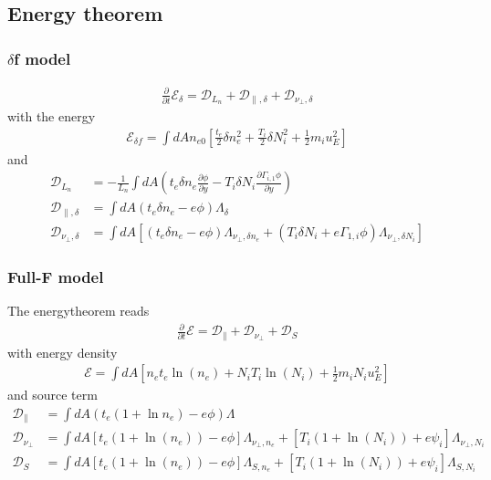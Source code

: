 \documentclass{hitec} %
\begin{document}
\subsection{Energy theorem}
\subsubsection{\(\delta\)f model}
\begin{eqnarray}
 \frac{\partial}{\partial t}  \mathcal{E}_{\delta } = \mathcal{D}_{L_n}+ \mathcal{D}_{\parallel,\delta } + \mathcal{D}_{\nu_\perp,\delta }
\end{eqnarray}
with the energy
\begin{eqnarray}
 \mathcal{E}_{\delta f} =  \int dA n_{e0}\left[\frac{t_e}{2} \delta{n}_e^2  +  \frac{T_i}{2} \delta{N}_i^2    + \frac{1}{2} m_i  u_E^2\right]
\end{eqnarray}
and 
\begin{align}
 \mathcal{D}_{L_n}                  &= - \frac{1}{L_n}\int dA \left( t_e \delta{n}_e \frac{\partial \phi }{\partial y}  - T_i \delta{N}_i \frac{\partial \Gamma_{i,1} \phi }{\partial y} \right) \\
\mathcal{D}_{\parallel,\delta } &=  \int dA \left(t_e \delta{n}_e - e \phi \right) \Lambda_\delta \\
\mathcal{D}_{\nu_\perp,\delta } &=  \int dA \left[ \left(t_e \delta{n}_e - e \phi \right) \Lambda_{\nu_\perp,\delta n_e} +  \left(T_i \delta{N}_i + e \Gamma_{1,i} \phi \right) \Lambda_{\nu_\perp,\delta N_i}\right]
\end{align}

\subsubsection{Full-F model}
The energytheorem reads
\begin{eqnarray}
 \frac{\partial}{\partial t}  \mathcal{E} = \mathcal{D}_\parallel + \mathcal{D}_{\nu_\perp} + \mathcal{D}_{S}
\end{eqnarray}
with energy density
\begin{eqnarray}
 \mathcal{E} = \int dA \left[ n_e t_e   \ln{\left(n_e\right)} + N_i T_i   \ln{\left(N_i\right)}+ \frac{1}{2} m_i N_i u_E^2\right]
\end{eqnarray}
and source term
\begin{align}
\mathcal{D}_\parallel  &= \int dA \left(t_e \left(1+\ln{n_e}\right) -e \phi\right)  \Lambda \\
\mathcal{D}_{\nu_\perp} &= \int dA \left[t_{e} (1+\ln (n_e))  - e \phi \right]\Lambda_{\nu_\perp,n_e} +\left[T_{i}  (1+\ln (N_i))+ e \psi_i \right] \Lambda_{\nu_\perp,N_i} \\
\mathcal{D}_{S} &= \int dA \left[t_{e} (1+\ln (n_e))  - e \phi \right]\Lambda_{S,n_e} +\left[T_{i}  (1+\ln (N_i))+ e \psi_i \right] \Lambda_{S,N_i} 
\end{align}
\end{document}
